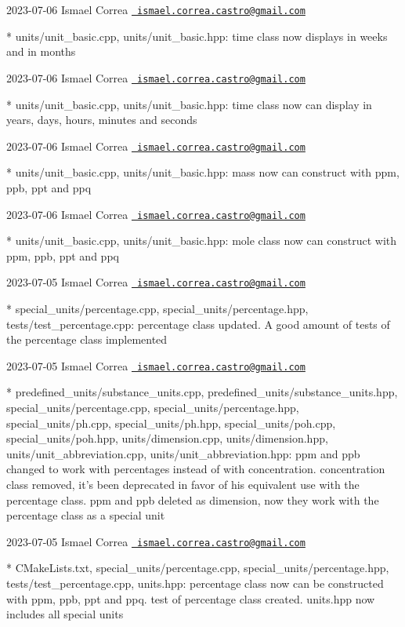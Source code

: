  2023-\/07-\/06 Ismael Correa \href{mailto:ismael.correa.castro@gmail.com}{\texttt{ ismael.\+correa.\+castro@gmail.\+com}} \begin{DoxyVerb}* units/unit_basic.cpp, units/unit_basic.hpp: time class now
displays in weeks and in months
\end{DoxyVerb}
 2023-\/07-\/06 Ismael Correa \href{mailto:ismael.correa.castro@gmail.com}{\texttt{ ismael.\+correa.\+castro@gmail.\+com}} \begin{DoxyVerb}* units/unit_basic.cpp, units/unit_basic.hpp: time class now can
display in years, days, hours, minutes and seconds
\end{DoxyVerb}
 2023-\/07-\/06 Ismael Correa \href{mailto:ismael.correa.castro@gmail.com}{\texttt{ ismael.\+correa.\+castro@gmail.\+com}} \begin{DoxyVerb}* units/unit_basic.cpp, units/unit_basic.hpp: mass now can construct
with ppm, ppb, ppt and ppq
\end{DoxyVerb}
 2023-\/07-\/06 Ismael Correa \href{mailto:ismael.correa.castro@gmail.com}{\texttt{ ismael.\+correa.\+castro@gmail.\+com}} \begin{DoxyVerb}* units/unit_basic.cpp, units/unit_basic.hpp: mole class now can
construct with ppm, ppb, ppt and ppq
\end{DoxyVerb}
 2023-\/07-\/05 Ismael Correa \href{mailto:ismael.correa.castro@gmail.com}{\texttt{ ismael.\+correa.\+castro@gmail.\+com}} \begin{DoxyVerb}* special_units/percentage.cpp, special_units/percentage.hpp,
tests/test_percentage.cpp: percentage class updated. A good amount
of tests of the percentage class implemented
\end{DoxyVerb}
 2023-\/07-\/05 Ismael Correa \href{mailto:ismael.correa.castro@gmail.com}{\texttt{ ismael.\+correa.\+castro@gmail.\+com}} \begin{DoxyVerb}* predefined_units/substance_units.cpp,
predefined_units/substance_units.hpp, special_units/percentage.cpp,
special_units/percentage.hpp, special_units/ph.cpp,
special_units/ph.hpp, special_units/poh.cpp, special_units/poh.hpp,
units/dimension.cpp, units/dimension.hpp,
units/unit_abbreviation.cpp, units/unit_abbreviation.hpp: ppm and
ppb changed to work with percentages instead of with concentration.
concentration class removed, it's been deprecated in favor of his
equivalent use with the percentage class. ppm and ppb deleted as
dimension, now they work with the percentage class as a special unit
\end{DoxyVerb}
 2023-\/07-\/05 Ismael Correa \href{mailto:ismael.correa.castro@gmail.com}{\texttt{ ismael.\+correa.\+castro@gmail.\+com}} \begin{DoxyVerb}* CMakeLists.txt, special_units/percentage.cpp,
special_units/percentage.hpp, tests/test_percentage.cpp, units.hpp: 
percentage class now can be constructed with ppm, ppb, ppt and ppq.
test of percentage class created. units.hpp now includes all special
units
\end{DoxyVerb}
